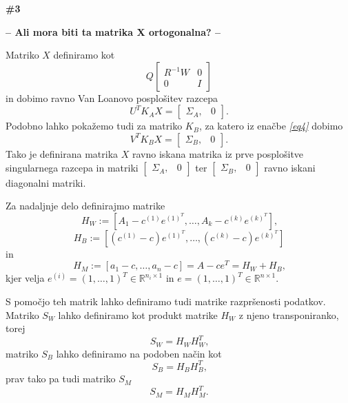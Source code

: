 \documentclass[mat1]{article}
\theoremstyle{definition}
\begin{document}
\begin{Large} \textbf{\#3} \end{Large}
\textbf{-- Ali mora biti ta matrika X ortogonalna? --}

Matriko $X$ definiramo kot
\begin{equation} \label{def-X}
Q
\begin{bmatrix}
R^{-1} W & 0 \\
0 & I 
\end{bmatrix}
\end{equation}
in dobimo ravno Van Loanovo posplošitev razcepa
\begin{equation} \label{Van-Loan-Ka}
U^T K_A X = \left[\begin{array}{cc} \Sigma_A, & 0 \end{array}\right] \text{.}
\end{equation}
Podobno lahko pokažemo tudi za matriko $K_B$, za katero iz enačbe \textit{\eqref{eq4}} dobimo
\begin{equation} \label{Van-Loan-Kb}
V^T K_B X = \left[\begin{array}{cc} \Sigma_B, & 0 \end{array}\right] \text{.}
\end{equation}
Tako je definirana matrika $X$ ravno iskana matrika iz prve posplošitve singularnega razcepa in matriki $\left[\begin{array}{cc} \Sigma_A, & 0 \end{array}\right]$ ter $\left[\begin{array}{cc} \Sigma_B, & 0 \end{array}\right]$ ravno iskani diagonalni matriki.

Za nadaljnje delo definirajmo matrike\begin{equation} \label{H_W1}
H_W :=\left[A_1 - c^{(1)}e^{(1)^T}, \ldots, A_k - c^{(k)}e^{(k)^T}\right] \text{,}
\end{equation}
\begin{equation} \label{H_B1}
H_B := \left[(c^{(1)} - c)e^{(1)^T}, \ldots,(c^{(k)} - c) e^{(k)^T}\right]
\end{equation}
in
$$H_M := \left[a_1 - c, \ldots, a_n - c\right] = A - ce^T = H_W + H_B\text{,}$$
kjer velja
$e^{(i)} = (1,\ldots, 1) ^T \in \mathbb{R}^{ n_i \times 1 }$ in $e =  (1,\ldots, 1) ^T \in \mathbb{R}^{ n \times 1 }$.

S pomočjo teh matrik lahko definiramo tudi matrike razpršenosti podatkov. Matriko $S_W$ lahko definiramo kot produkt matrike $H_W$ z njeno transponiranko, torej
\begin{equation} \label{S_W-def}
S_W = H_W H_W^T 
\text{,}
\end{equation}
matriko $S_B$ lahko definiramo na podoben način kot
\begin{equation} \label{S_B-def}
S_B = H_B H_B^T 
\text{,}
\end{equation}
prav tako pa tudi matriko $S_M$
\begin{equation} \label{S_M-def}
S_M = H_M H_M^T 
\text{.}
\end{equation}
\end{document}
